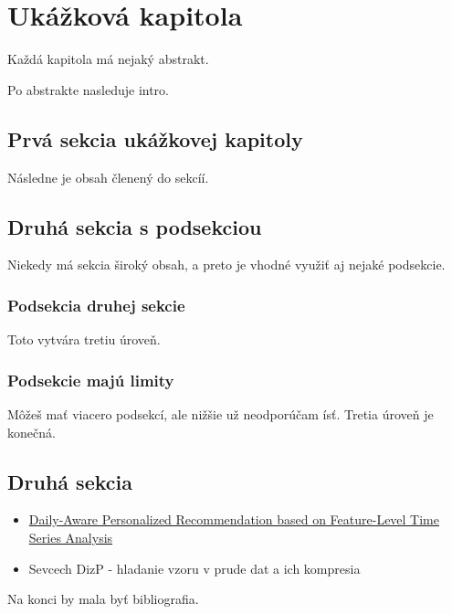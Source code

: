 \chapter{Ukážková kapitola}

Každá kapitola má nejaký abstrakt.

Po abstrakte nasleduje intro.

\section{Prvá sekcia ukážkovej kapitoly}

Následne je obsah členený do sekcíí.

\section{Druhá sekcia s podsekciou}

Niekedy má sekcia široký obsah, a preto je vhodné využiť aj nejaké podsekcie.

\subsection{Podsekcia druhej sekcie}
Toto vytvára tretiu úroveň.

\subsection{Podsekcie majú limity}
Môžeš mať viacero podsekcí, ale nižšie už neodporúčam ísť. Tretia úroveň je konečná.

\section{Druhá sekcia}

\begin{itemize}
    \item \href{http://www.www2015.it/documents/proceedings/proceedings/p1373.pdf}{Daily-Aware Personalized Recommendation based on Feature-Level Time Series Analysis}
    \item Sevcech DizP - hladanie vzoru v prude dat a ich kompresia
\end{itemize}

Na konci by mala byť bibliografia.

\renewcommand{\myBibliography}[0] {./references.bib}
\printbibliography[heading=references,segment=\therefsegment,resetnumbers=true]